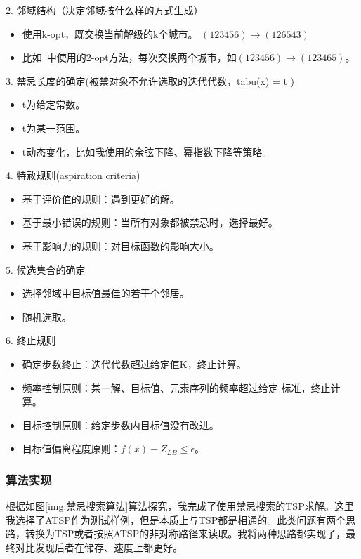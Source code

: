 \documentclass[lang=cn,11pt]{elegantpaper}
\begin{document}
2. 邻域结构（决定邻域按什么样的方式生成）
        \begin{itemize}[leftmargin=50pt]
        \item 使用k-opt，既交换当前解级的k个城市。
            $(123456) \rightarrow (126543)    $
        \item 比如~\cite{2opt}中使用的2-opt方法，每次交换两个城市，如$(123456) \rightarrow (123465)    $。
        \end{itemize}

3. 禁忌长度的确定(被禁对象不允许选取的迭代代数，tabu(x) = t )
        \begin{itemize}[leftmargin=50pt]
        \item t为给定常数。
        \item t为某一范围。
        \item t动态变化，比如我使用的余弦下降、幂指数下降等策略。
        \end{itemize}
4. 特赦规则(aspiration criteria)
        \begin{itemize}[leftmargin=50pt]
        \item 基于评价值的规则：遇到更好的解。
        \item 基于最小错误的规则：当所有对象都被禁忌时，选择最好。
        \item 基于影响力的规则：对目标函数的影响大小。
        \end{itemize}
5. 候选集合的确定
        \begin{itemize}[leftmargin=50pt]
        \item 选择邻域中目标值最佳的若干个邻居。
        \item 随机选取。
        \end{itemize}
6. 终止规则
        \begin{itemize}[leftmargin=50pt]
        \item 确定步数终止：迭代代数超过给定值K，终止计算。
        \item 频率控制原则：某一解、目标值、元素序列的频率超过给定                                   标准，终止计算。
        \item 目标控制原则：给定步数内目标值没有改进。
        \item 目标值偏离程度原则：$f(x) - Z_{LB} \leq \epsilon$。
        \end{itemize}

\subsubsection{算法实现}
根据如图\ref{img:禁忌搜索算法}算法探究，我完成了使用禁忌搜索的TSP求解。这里我选择了ATSP作为测试样例，但是本质上与TSP都是相通的。此类问题有两个思路，转换为TSP或者按照ATSP的非对称路径来读取。我将两种思路都实现了，最终对比发现后者在储存、速度上都更好。
\end{document}
